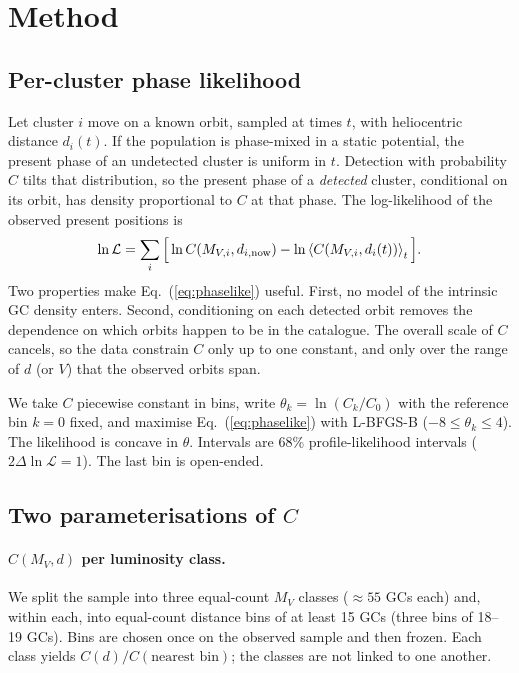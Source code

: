 \documentclass[11pt,a4paper]{article}
\newcommand{\MV}{M_V}
\newcommand{\dhel}{d}
\newcommand{\avg}[1]{\left\langle #1 \right\rangle_t}
\begin{document}
\section{Method}
\label{sec:method}

\subsection{Per-cluster phase likelihood}

Let cluster $i$ move on a known orbit, sampled at times $t$, with heliocentric distance
$\dhel_i(t)$. If the population is phase-mixed in a static potential, the present phase of an
undetected cluster is uniform in $t$. Detection with probability $C$ tilts that distribution, so the
present phase of a \emph{detected} cluster, conditional on its orbit, has density proportional to
$C$ at that phase. The log-likelihood of the observed present positions is
\begin{equation}
\ln \mathcal{L} = \sum_i \Big[\ln C(M_{V,i}, \dhel_{i,\rm now}) - \ln \avg{C(M_{V,i},\dhel_i(t))}\Big].
\label{eq:phaselike}
\end{equation}
Two properties make Eq.~(\ref{eq:phaselike}) useful. First, no model of the intrinsic GC density
enters. Second, conditioning on each detected orbit removes the dependence on which orbits happen to
be in the catalogue. The overall scale of $C$ cancels, so the data constrain $C$ only up to one
constant, and only over the range of $\dhel$ (or $V$) that the observed orbits span.

We take $C$ piecewise constant in bins, write $\theta_k = \ln(C_k/C_0)$ with the reference bin
$k=0$ fixed, and maximise Eq.~(\ref{eq:phaselike}) with L-BFGS-B ($-8 \le \theta_k \le 4$). The
likelihood is concave in $\theta$. Intervals are 68\% profile-likelihood intervals
($2\Delta\ln\mathcal{L}=1$). The last bin is open-ended.

\subsection{Two parameterisations of $C$}

\paragraph{$C(\MV,\dhel)$ per luminosity class.} We split the sample into three equal-count $\MV$
classes ($\approx 55$ GCs each) and, within each, into equal-count distance bins of at least 15 GCs
(three bins of 18--19 GCs). Bins are chosen once on the observed sample and then frozen. Each class
yields $C(\dhel)/C(\text{nearest bin})$; the classes are not linked to one another.
\end{document}
